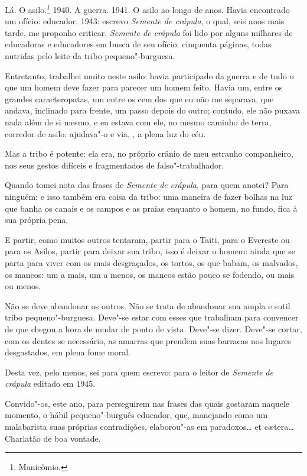 Lá. O asilo.\footnote{Manicômio.} 1940. A guerra. 1941. O asilo ao longo
de anos. Havia encontrado um ofício: educador. 1943: escrevo
\emph{Semente de crápula}, o qual, seis anos mais tarde, me proponho
criticar. \emph{Semente de crápula} foi lido por alguns milhares de
educadoras e educadores em busca de seu ofício: cinquenta páginas, todas
nutridas pelo leite da tribo pequeno"-burguesa.

Entretanto, trabalhei muito
neste asilo: havia participado da guerra e de tudo o que um homem deve
fazer para parecer um homem feito. Havia um, entre os grandes
caracteropatas, um entre os cem dos que eu não me separava, que andava,
inclinado para frente, um passo depois do outro; contudo, ele não puxava
nada além de si mesmo, e eu estava com ele, no mesmo caminho de terra,
corredor de asilo; ajudava"-o e via, , a plena luz do céu.

Mas a tribo é potente: ela era, no próprio crânio de meu estranho
companheiro, nos seus gestos difíceis e fragmentados de
falso"-trabalhador.

Quando tomei nota das frases de \emph{Semente de crápula}, para quem
anotei? Para ninguém: e isso também era coisa da tribo: uma maneira de
fazer bolhas na luz que banha os canais e os campos e as praias enquanto
o homem, no fundo, fica à sua própria pena.

E partir, como muitos outros tentaram, partir para o Taiti, para o
Evereste ou para os Asilos, partir para deixar sua tribo, isso é deixar
o homem: ainda que se parta para viver com os mais desgraçados, os
tortos, os que babam, os malvados, os mancos: um a mais, um a menos, os
mancos estão pouco se fodendo, ou mais ou menos.

Não se deve abandonar os outros. Não se trata de abandonar sua ampla e
sutil tribo pequeno"-burguesa. Deve"-se estar com esses que trabalham para
convencer de que chegou a hora de mudar de ponto de vista. Deve"-se
dizer. Deve"-se cortar, com os dentes se necessário, as amarras que
prendem suas barracas nos lugares desgastados, em plena fome moral.

Desta vez, pelo menos, sei para quem escrevo: para o leitor de
\emph{Semente de crápula} editado em 1945.

Convido"-os, este ano, para perseguirem nas frases das quais gostaram
naquele momento, o hábil pequeno"-burguês educador, que, manejando como
um malabarista suas próprias contradições, elaborou"-as em paradoxos\ldots{}
et cætera\ldots{} Charlatão de boa vontade.
